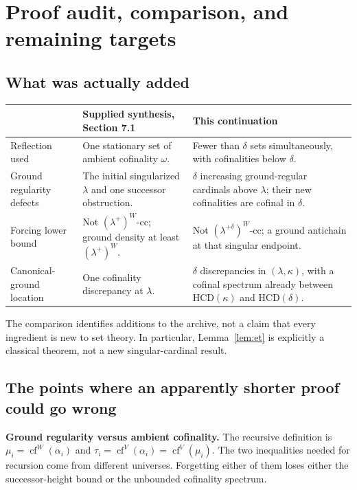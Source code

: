 \documentclass[11pt,letterpaper]{article}
\theoremstyle{definition}
\numberwithin{equation}{section}
\newcommand{\HCD}{\mathrm{HCD}}
\newcommand{\cf}{\operatorname{cf}}
\newcommand{\cc}{\text{-cc}}
\begin{document}
\section{Proof audit, comparison, and remaining targets}\label{sec:audit}

\subsection{What was actually added}

\begin{center}
\small
\renewcommand{\arraystretch}{1.14}
\begin{tabularx}{\textwidth}{@{}>{\raggedright\arraybackslash}p{}YY@{}}
\toprule
&\textbf{Supplied synthesis, Section 7.1}&\textbf{This continuation}\\
\midrule
Reflection used&One stationary set of ambient cofinality $\omega$.&Fewer than $\delta$ sets simultaneously, with cofinalities below $\delta$.\\
Ground regularity defects&The initial singularized $\lambda$ and one successor obstruction.&$\delta$ increasing ground-regular cardinals above $\lambda$; their new cofinalities are cofinal in $\delta$.\\
Forcing lower bound&Not $(\lambda^+)^W\cc$; ground density at least $(\lambda^+)^W$.&Not $(\lambda^{+\delta})^W\cc$; a ground antichain at that singular endpoint.\\
Canonical-ground location&One cofinality discrepancy at $\lambda$.&$\delta$ discrepancies in $(\lambda,\kappa)$, with a cofinal spectrum already between $\HCD(\kappa)$ and $\HCD(\delta)$.\\
\bottomrule
\end{tabularx}
\end{center}

The comparison identifies additions to the archive, not a claim that every ingredient is new to set theory. In particular, Lemma~\ref{lem:et} is explicitly a classical theorem, not a new singular-cardinal result.

\subsection{The points where an apparently shorter proof could go wrong}

\textbf{Ground regularity versus ambient cofinality.}
The recursive definition is $\mu_i=\cf^W(\alpha_i)$ and
$\tau_i=\cf^V(\alpha_i)=\cf^V(\mu_i)$. The two inequalities needed for recursion come from different universes. Forgetting either of them loses either the successor-height bound or the unbounded cofinality spectrum.
\end{document}
